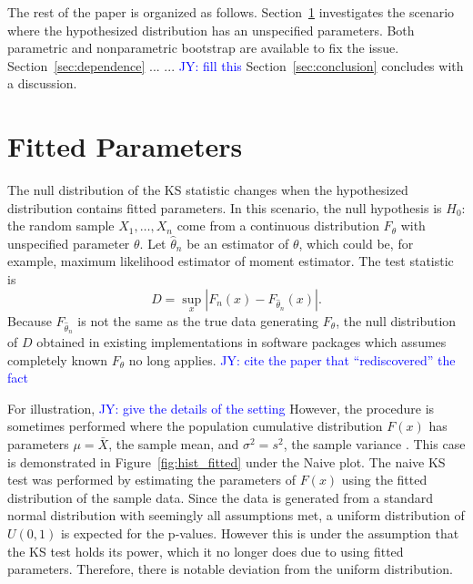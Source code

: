 \documentclass[12pt, letterpaper, titlepage]{article}
\newcommand{\jy}[1]{\textcolor{blue}{JY: #1}}
\begin{document}
The rest of the paper is organized as follows. Section~\ref{sec:fitted}
investigates the scenario where the hypothesized distribution has an unspecified
parameters. Both parametric and nonparametric bootstrap are available to fix the
issue. Section~\ref{sec:dependence} ... ... \jy{fill this}
Section~\ref{sec:conclusion} concludes with a discussion.

\section{Fitted Parameters}\label{sec:fitted}

The null distribution of the KS statistic changes when the hypothesized
distribution contains fitted parameters. In this scenario, the null hypothesis
is $H_0$: the random sample $X_1, \ldots, X_n$ come from a continuous
distribution $F_{\theta}$ with unspecified parameter $\theta$.
Let $\hat\theta_n$ be an estimator of $\theta$, which could be, for example,
maximum likelihood estimator of moment estimator. The test statistic is
\[
  D = \sup_x | F_n(x) - F_{\hat\theta_n}(x) |.
\]
Because $F_{\hat\theta_n}$ is not the same as the true data generating
$F_\theta$, the null distribution of $D$ obtained in existing implementations in
software packages which assumes completely known $F_\theta$ no long applies.
\jy{cite the paper that ``rediscovered'' the fact}


For illustration, \jy{give the details of the setting}
However, the procedure is sometimes performed where the population cumulative 
distribution $F(x)$ has parameters $\mu=\bar X$, the sample mean, and $\sigma^2=s^2$, 
the sample variance \citep{Lilliefors}. This case is demonstrated in Figure~\ref{fig:hist_fitted} 
under the Naive plot. The naive KS test was performed by estimating the parameters 
of $F(x)$ using the fitted distribution of the sample data. Since the data is generated 
from a standard normal distribution with seemingly all assumptions met, a uniform 
distribution of $U(0,1)$ is expected for the p-values. However this is under the 
assumption that the KS test holds its power, which it no longer does due to using 
fitted parameters. Therefore, there is notable deviation from the uniform distribution. 
\end{document}
